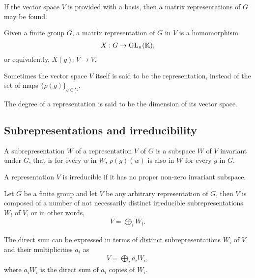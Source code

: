 	If the vector space $V$ is provided with a basis, then a matrix representations of $G$ may be found.
	\begin{definition}
		Given a finite group $G$, a matrix representation of $G$ in $V$ is a homomorphism
		\begin{align}
			X: G \rightarrow \text{GL}_n(\mathbb{K}),
		\end{align}
		or equivalently, $X(g): V \rightarrow V$.
	\end{definition}
	
	\begin{note}
		Sometimes the vector space $V$ itself is said to be the representation, instead of the set of maps $\{\rho(g)\}_{g \in G}$.
	\end{note}
	
	\begin{definition}
		The degree of a representation is said to be the dimension of its vector space.
	\end{definition}
	
	\subsection{Subrepresentations and irreducibility}
	
		\begin{definition}[Subrepresentation]
			A subrepresentation $W$ of a representation $V$ of $G$ is a subspace $W$ of $V$ invariant under $G$, that is for every $w$ in $W$, $\rho(g)(w)$ is also in $W$ for every $g$ in $G$.
		\end{definition}
		
		\begin{definition}
			A representation $V$ is irreducible if it has no proper non-zero invariant subspace.
		\end{definition}
		
		\begin{theorem}\label{thm:maschke}
			Let $G$ be a finite group and let $V$ be any arbitrary representation of $G$, then $V$ is composed of a number of not necessarily distinct irreducible subrepresentations $W_i$ of $V$, or in other words,
			\begin{align}
				V = \bigoplus_i W_i.
			\end{align}
		\end{theorem}
		
		\begin{note}
			The direct sum can be expressed in terms of \underline{distinct} subrepresentations $W_i$ of $V$ and their multiplicities $a_i$ as
			\begin{align}
				V = \bigoplus_i a_i W_i,
			\end{align}
			where $a_i W_i$ is the direct sum of $a_i$ copies of $W_i$.
		\end{note}
		
